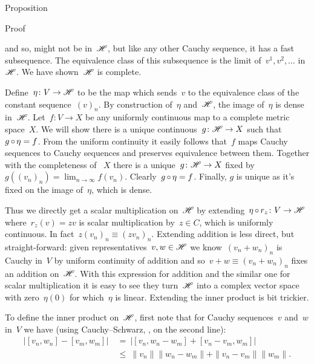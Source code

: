 \documentclass[b]{subfiles}
\begin{document}
\begin{parsec}
\begin{point}{Proposition}
\begin{point}{Proof}
\begin{point}
    and so, might not be in~$\mathscr{H}$,
    but like any other Cauchy sequence,
    it has a fast subsequence.
The equivalence class
of this subsequence is the limit of~$v^1, v^2, \ldots$ in~$\mathscr{H}$.
We have shown~$\mathscr{H}$ is complete.
\end{point}
\begin{point}%
Define~$\eta\colon V \to \mathscr{H}$
    to be the map which sends~$v$ to the equivalence class of the
    constant sequence~$(v)_n$.
By construction of~$\eta$ and~$\mathscr{H}$,
    the image of~$\eta$ is dense in~$\mathscr{H}$.
Let~$f\colon V \to X$
    be any uniformly continuous map to a complete metric space~$X$.
We will show there is a unique continuous~$g\colon \mathscr{H} \to X$
    such that~$g \mathop{\circ} \eta = f$.
From the uniform continuity it easily follows
    that~$f$ maps Cauchy sequences to Cauchy sequences
    and preserves equivalence between them.
Together with the completeness of ~$X$
    there is a unique~$g\colon \mathscr{H} \to X$
    fixed by~$g((v_n)_n) = \lim_{n\to\infty}f(v_n)$.
Clearly~$g \mathop{\circ} \eta = f$.
Finally, $g$ is unique as it's fixed on the image of~$\eta$, which is dense.
\end{point}
\begin{point}%
Thus we directly get a scalar multiplication
    on~$\mathscr{H}$ by extending~$\eta \mathop{\circ} r_z \colon V \to \mathscr{H}$
    where~$r_z(v) = zv$ is scalar multiplication by~$z \in C$,
    which is uniformly continuous.
In fact~$z (v_n)_n \equiv (z v_n)_n$.
Extending addition is less direct, but straight-forward:
    given representatives~$v,w \in \mathscr{H}$
    we know~$(v_n+w_n)_n$ is Cauchy in~$V$
    by uniform continuity of addition and so~$v+w \equiv (v_n+w_n)_n$
        fixes an addition on~$\mathscr{H}$.
With this expression for addition and the similar one for
    scalar multiplication it is easy to see
    they turn~$\mathscr{H}$ into a complex vector space with zero~$\eta(0)$
    for which~$\eta$ is linear.
Extending the inner product is bit trickier.
\end{point}
\begin{point}%
To define the inner product on~$\mathscr{H}$,
first note that for Cauchy sequences~$v$ and~$w$ in~$V$
we have (using Cauchy--Schwarz, , on the second line):
\begin{align*}
    \bigl|[v_n,w_n] - [v_m,w_m]\bigr|
    & \ =\  \bigl|[v_n,w_n-w_m] + [v_n - v_m,w_m]\bigr| \\
    & \ \leq\  \|v_n\| \|w_n - w_m\| + \|v_n-v_m\|\|w_m\|.
\end{align*}

\end{point}
\end{point}
\end{point}
\end{parsec}
\end{document}
